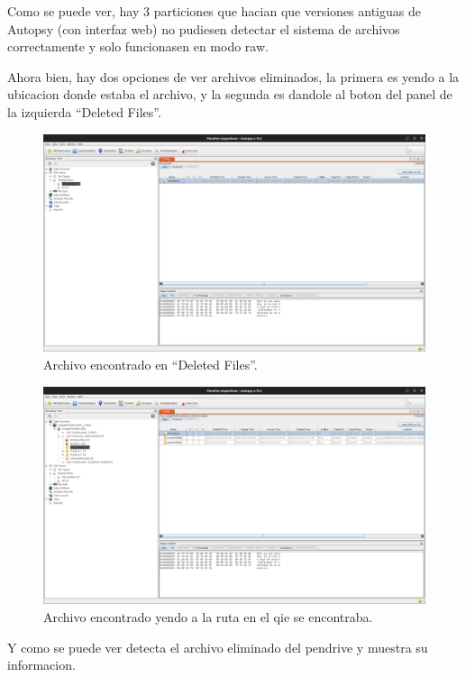 \documentclass{article}
\begin{document}
Como se puede ver, hay 3 particiones que hacian que versiones antiguas de Autopsy (con interfaz web) no pudiesen detectar el sistema de archivos correctamente y solo funcionasen en modo raw.

Ahora bien, hay dos opciones de ver archivos eliminados, la primera es yendo a la ubicacion donde estaba el archivo, y la segunda es dandole al boton del panel de la izquierda ``Deleted Files''.

\begin{figure}[H]
    \centering
    \includegraphics[width=\textwidth]{imagenes/Captura desde 2022-12-03 21-52-53.png}
    \caption{Archivo encontrado en ``Deleted Files''.}
\end{figure}

\begin{figure}[H]
    \centering
    \includegraphics[width=\textwidth]{imagenes/Captura desde 2022-12-03 21-53-51.png}
    \caption{Archivo encontrado yendo a la ruta en el qie se encontraba.}
\end{figure}

Y como se puede ver detecta el archivo eliminado del pendrive y muestra su informacion.
\end{document}
